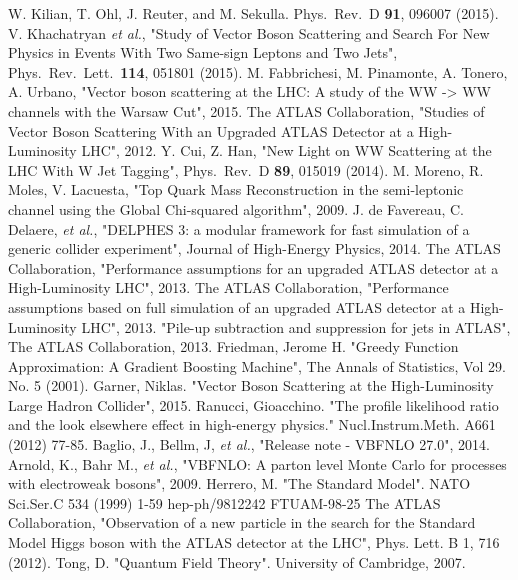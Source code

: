 \documentclass[10pt]{ucscthesisbs}
\begin{document}
\begin{thebibliography}{999}
W. Kilian, T. Ohl, J. Reuter, and M. Sekulla.
Phys.\ Rev.\ D {\bf 91}, 096007 (2015).
V. Khachatryan \textit{et al.}, "Study of Vector Boson Scattering and Search For New Physics in Events With Two Same-sign Leptons and Two Jets",
Phys.\ Rev.\ Lett.\ {\bf 114}, 051801 (2015).
M. Fabbrichesi, M. Pinamonte, A. Tonero, A. Urbano, "Vector boson scattering at the LHC: A study of the WW -> WW channels with the Warsaw Cut", 2015.
The ATLAS Collaboration, "Studies of Vector Boson Scattering With an Upgraded ATLAS Detector at a High-Luminosity LHC", 2012. 
Y. Cui, Z. Han, "New Light on WW Scattering at the LHC With W Jet Tagging", Phys.\ Rev.\ D {\bf 89}, 015019 (2014).
M. Moreno, R. Moles, V. Lacuesta, "Top Quark Mass Reconstruction in the semi-leptonic channel using the Global Chi-squared algorithm", 2009.
J. de Favereau, C. Delaere, \textit{et al.}, "DELPHES 3: a modular framework for fast simulation of a generic collider experiment", Journal of High-Energy Physics, 2014.
The ATLAS Collaboration, "Performance assumptions for an upgraded ATLAS detector at a High-Luminosity LHC", 2013.
The ATLAS Collaboration, "Performance assumptions based on full simulation of an upgraded ATLAS detector at a High-Luminosity LHC", 2013.
"Pile-up subtraction and suppression for jets in ATLAS", The ATLAS Collaboration, 2013.
Friedman, Jerome H. "Greedy Function Approximation: A Gradient Boosting Machine", The Annals of Statistics, Vol 29. No. 5 (2001).
Garner, Niklas. "Vector Boson Scattering at the High-Luminosity Large Hadron Collider", 2015.
Ranucci, Gioacchino. "The profile likelihood ratio and the look elsewhere effect in high-energy physics." Nucl.Instrum.Meth. A661 (2012) 77-85.
Baglio, J., Bellm, J, \textit{et al.}, "Release note - VBFNLO 27.0", 2014.
Arnold, K., Bahr M., \textit{et al.}, "VBFNLO: A parton level Monte Carlo for processes with electroweak bosons", 2009.
Herrero, M. "The Standard Model". NATO Sci.Ser.C 534 (1999) 1-59 hep-ph/9812242 FTUAM-98-25
The ATLAS Collaboration, "Observation of a new particle in the search for the Standard Model Higgs boson with the ATLAS detector at the LHC", Phys. Lett. B 1, 716 (2012).
Tong, D. "Quantum Field Theory". University of Cambridge, 2007.

\end{thebibliography}
\end{document}
